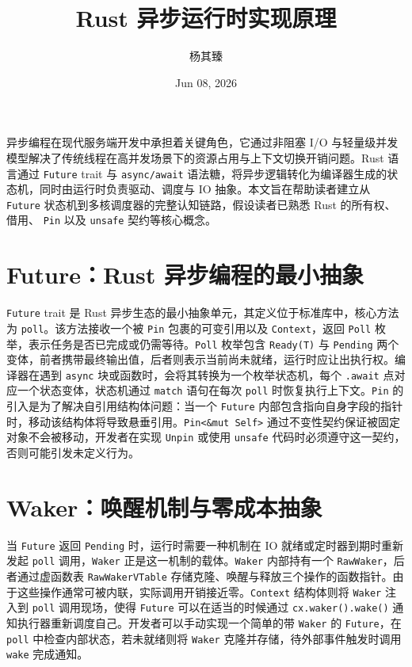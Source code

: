 \title{Rust 异步运行时实现原理}
\author{杨其臻}
\date{Jun 08, 2026}
\maketitle
异步编程在现代服务端开发中承担着关键角色，它通过非阻塞 I/O 与轻量级并发模型解决了传统线程在高并发场景下的资源占用与上下文切换开销问题。Rust 语言通过 \texttt{Future} trait 与 \texttt{async/await} 语法糖，将异步逻辑转化为编译器生成的状态机，同时由运行时负责驱动、调度与 IO 抽象。本文旨在帮助读者建立从 \texttt{Future} 状态机到多核调度器的完整认知链路，假设读者已熟悉 Rust 的所有权、借用、 \texttt{Pin} 以及 \texttt{unsafe} 契约等核心概念。\par
\chapter{Future：Rust 异步编程的最小抽象}
\texttt{Future} trait 是 Rust 异步生态的最小抽象单元，其定义位于标准库中，核心方法为 \texttt{poll}。该方法接收一个被 \texttt{Pin} 包裹的可变引用以及 \texttt{Context}，返回 \texttt{Poll} 枚举，表示任务是否已完成或仍需等待。\texttt{Poll} 枚举包含 \texttt{Ready(T)} 与 \texttt{Pending} 两个变体，前者携带最终输出值，后者则表示当前尚未就绪，运行时应让出执行权。编译器在遇到 \texttt{async} 块或函数时，会将其转换为一个枚举状态机，每个 \texttt{.await} 点对应一个状态变体，状态机通过 \texttt{match} 语句在每次 \texttt{poll} 时恢复执行上下文。\texttt{Pin} 的引入是为了解决自引用结构体问题：当一个 \texttt{Future} 内部包含指向自身字段的指针时，移动该结构体将导致悬垂引用。\texttt{Pin<\&{}mut Self>} 通过不变性契约保证被固定对象不会被移动，开发者在实现 \texttt{Unpin} 或使用 \texttt{unsafe} 代码时必须遵守这一契约，否则可能引发未定义行为。\par
\chapter{Waker：唤醒机制与零成本抽象}
当 \texttt{Future} 返回 \texttt{Pending} 时，运行时需要一种机制在 IO 就绪或定时器到期时重新发起 \texttt{poll} 调用，\texttt{Waker} 正是这一机制的载体。\texttt{Waker} 内部持有一个 \texttt{RawWaker}，后者通过虚函数表 \texttt{RawWakerVTable} 存储克隆、唤醒与释放三个操作的函数指针。由于这些操作通常可被内联，实际调用开销接近零。\texttt{Context} 结构体则将 \texttt{Waker} 注入到 \texttt{poll} 调用现场，使得 \texttt{Future} 可以在适当的时候通过 \texttt{cx.waker().wake()} 通知执行器重新调度自己。开发者可以手动实现一个简单的带 \texttt{Waker} 的 \texttt{Future}，在 \texttt{poll} 中检查内部状态，若未就绪则将 \texttt{Waker} 克隆并存储，待外部事件触发时调用 \texttt{wake} 完成通知。\par
